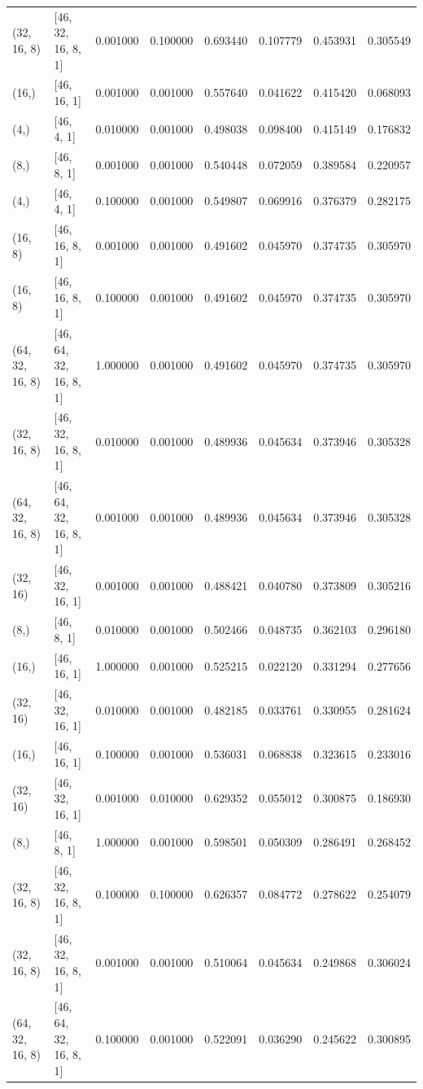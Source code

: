 \begin{tabular}{llrrrrrr}
(32, 16, 8) & [46, 32, 16, 8, 1] & 0.001000 & 0.100000 & 0.693440 & 0.107779 & 0.453931 & 0.305549 \\
(16,) & [46, 16, 1] & 0.001000 & 0.001000 & 0.557640 & 0.041622 & 0.415420 & 0.068093 \\
(4,) & [46, 4, 1] & 0.010000 & 0.001000 & 0.498038 & 0.098400 & 0.415149 & 0.176832 \\
(8,) & [46, 8, 1] & 0.001000 & 0.001000 & 0.540448 & 0.072059 & 0.389584 & 0.220957 \\
(4,) & [46, 4, 1] & 0.100000 & 0.001000 & 0.549807 & 0.069916 & 0.376379 & 0.282175 \\
(16, 8) & [46, 16, 8, 1] & 0.001000 & 0.001000 & 0.491602 & 0.045970 & 0.374735 & 0.305970 \\
(16, 8) & [46, 16, 8, 1] & 0.100000 & 0.001000 & 0.491602 & 0.045970 & 0.374735 & 0.305970 \\
(64, 32, 16, 8) & [46, 64, 32, 16, 8, 1] & 1.000000 & 0.001000 & 0.491602 & 0.045970 & 0.374735 & 0.305970 \\
(32, 16, 8) & [46, 32, 16, 8, 1] & 0.010000 & 0.001000 & 0.489936 & 0.045634 & 0.373946 & 0.305328 \\
(64, 32, 16, 8) & [46, 64, 32, 16, 8, 1] & 0.001000 & 0.001000 & 0.489936 & 0.045634 & 0.373946 & 0.305328 \\
(32, 16) & [46, 32, 16, 1] & 0.001000 & 0.001000 & 0.488421 & 0.040780 & 0.373809 & 0.305216 \\
(8,) & [46, 8, 1] & 0.010000 & 0.001000 & 0.502466 & 0.048735 & 0.362103 & 0.296180 \\
(16,) & [46, 16, 1] & 1.000000 & 0.001000 & 0.525215 & 0.022120 & 0.331294 & 0.277656 \\
(32, 16) & [46, 32, 16, 1] & 0.010000 & 0.001000 & 0.482185 & 0.033761 & 0.330955 & 0.281624 \\
(16,) & [46, 16, 1] & 0.100000 & 0.001000 & 0.536031 & 0.068838 & 0.323615 & 0.233016 \\
(32, 16) & [46, 32, 16, 1] & 0.001000 & 0.010000 & 0.629352 & 0.055012 & 0.300875 & 0.186930 \\
(8,) & [46, 8, 1] & 1.000000 & 0.001000 & 0.598501 & 0.050309 & 0.286491 & 0.268452 \\
(32, 16, 8) & [46, 32, 16, 8, 1] & 0.100000 & 0.100000 & 0.626357 & 0.084772 & 0.278622 & 0.254079 \\
(32, 16, 8) & [46, 32, 16, 8, 1] & 0.001000 & 0.001000 & 0.510064 & 0.045634 & 0.249868 & 0.306024 \\
(64, 32, 16, 8) & [46, 64, 32, 16, 8, 1] & 0.100000 & 0.001000 & 0.522091 & 0.036290 & 0.245622 & 0.300895 \\

\end{tabular}
